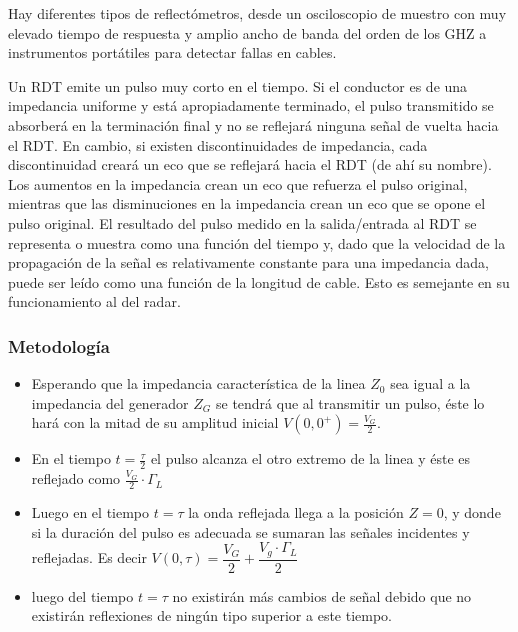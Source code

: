 \documentclass[11pt,onecolumn]{article}
\begin{document}
Hay diferentes tipos de reflectómetros, desde un osciloscopio de 
muestro con muy elevado tiempo de respuesta y amplio ancho de banda del orden de los 
GHZ a instrumentos portátiles para detectar fallas en cables. 

Un RDT emite un pulso muy corto en el tiempo. Si el conductor es de una impedancia uniforme
y está apropiadamente terminado, el pulso transmitido se absorberá en la terminación final
y no se reflejará ninguna señal de vuelta hacia el RDT. En cambio, si existen
discontinuidades de impedancia, cada discontinuidad creará un eco que se reflejará hacia el
RDT (de ahí su nombre). Los aumentos en la impedancia crean un eco que refuerza el pulso
original, mientras que las disminuciones en la impedancia crean un eco que se opone el
pulso original. El resultado del pulso medido en la salida/entrada al RDT se representa o
muestra como una función del tiempo y, dado que la velocidad de la propagación de la señal
es relativamente constante para una impedancia dada, puede ser leído como una función de la
longitud de cable. Esto es semejante en su funcionamiento al del radar.

\subsubsection*{Metodología}

\begin{itemize}
\item Esperando que la impedancia característica de la linea $Z_{0}$ sea igual a la impedancia del generador $Z_{G}$ se tendrá que al transmitir un pulso, éste lo hará con la mitad de su amplitud inicial $ V(0,0^{+}) = \frac{V_{G}}{2}$. 

\item En el tiempo $t = \frac{\tau}{2}$ el pulso alcanza el otro extremo de la linea y éste es reflejado como $\frac{V_{G}}{2} \cdot \Gamma_{L}$


\item Luego en el tiempo $t = \tau$ la onda reflejada llega a la posición $Z = 0$, y donde si la duración del pulso es adecuada se sumaran las señales incidentes y reflejadas. Es decir $V(0,\tau) = \dfrac{V_{G}}{2} + \dfrac{V_{g}\cdot \Gamma_{L}}{2}$ 

\item luego del tiempo $t = \tau$ no existirán más cambios de señal debido que no existirán reflexiones de ningún tipo superior a este tiempo.

\end{itemize}
\end{document}
